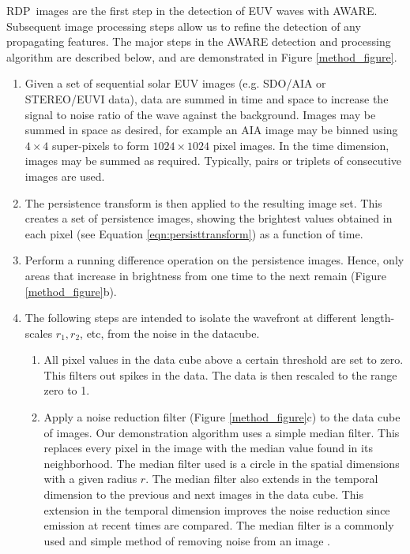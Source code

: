 \documentclass[referee,a4paper,12pt,traditabstract]{swsc}
\newcommand{\RDP}{RDP}
\begin{document}
\begin{linenumbers}
\RDP\ images are the first step in the detection of EUV waves with
AWARE. Subsequent image processing steps allow us to refine the
detection of any propagating features. The major steps in the AWARE
detection and processing algorithm are described below, and are
demonstrated in Figure \ref{method_figure}.

\begin{enumerate}

\item Given a set of sequential solar EUV images (e.g. SDO/AIA or
  STEREO/EUVI data), data are summed in time and space to increase the
  signal to noise ratio of the wave against the background. Images may
  be summed in space as desired, for example an AIA image may be
  binned using $4\times4$ super-pixels to form $1024\times1024$ pixel
  images. In the time dimension, images may be summed as
  required. Typically, pairs or triplets of consecutive images are
  used.

\item The persistence transform is then applied to the resulting image
  set.  This creates a set of persistence images, showing the
  brightest values obtained in each pixel (see Equation
  \ref{eqn:persisttransform}) as a function of time.

\item Perform a running difference operation on the
  persistence images. Hence, only areas that increase in brightness
  from one time to the next remain (Figure \ref{method_figure}b).

\item 
The following steps are intended to isolate the wavefront at different
length-scales $r_{1}, r_{2}$\textellipsis, etc, from the noise in the
datacube.

\begin{enumerate}

\item All pixel values in the data cube above a certain threshold are
  set to zero. This filters out spikes in the data.  The data is then
  rescaled to the range zero to 1.

\item Apply a noise reduction filter (Figure \ref{method_figure}c) to
  the data cube of images.  Our demonstration algorithm uses a simple
  median filter.  This replaces every pixel in the image with the
  median value found in its neighborhood.  The median filter used is a
  circle in the spatial dimensions with a given radius $r$.  The
  median filter also extends in the temporal dimension to the previous
  and next images in the data cube.  This extension in the temporal
  dimension improves the noise reduction since emission at recent
  times are compared.  The median filter is a commonly used and simple
  method of removing noise from an image \citep{2002dip..book.....G}.


\end{enumerate}
\end{enumerate}
\end{linenumbers}
\end{document}
